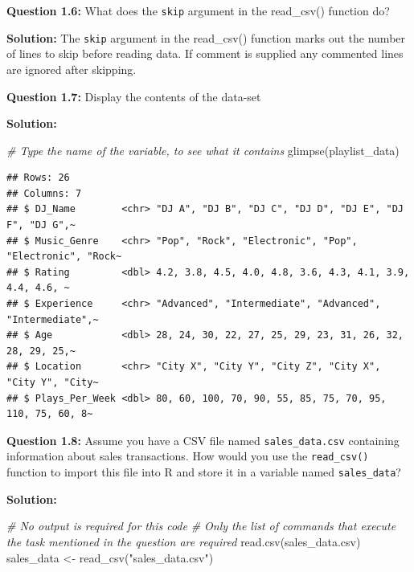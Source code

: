 \documentclass[
]{article}
\newenvironment{Shaded}{\begin{snugshade}}{\end{snugshade}}
\newcommand{\CommentTok}[1]{\textcolor[rgb]{0.56,0.35,0.01}{\textit{#1}}}
\newcommand{\FunctionTok}[1]{\textcolor[rgb]{0.00,0.00,0.00}{#1}}
\newcommand{\NormalTok}[1]{#1}
\newcommand{\OtherTok}[1]{\textcolor[rgb]{0.56,0.35,0.01}{#1}}
\newcommand{\StringTok}[1]{\textcolor[rgb]{0.31,0.60,0.02}{#1}}
\begin{document}
\textbf{Question 1.6:} What does the \texttt{skip} argument in the
read\_csv() function do?

\textbf{Solution:} The \texttt{skip} argument in the read\_csv()
function marks out the number of lines to skip before reading data. If
comment is supplied any commented lines are ignored after skipping.

\textbf{Question 1.7:} Display the contents of the data-set

\textbf{Solution:}

\begin{Shaded}
\begin{Highlighting}[]
\CommentTok{\# Type the name of the variable, to see what it contains}
\FunctionTok{glimpse}\NormalTok{(playlist\_data)}
\end{Highlighting}
\end{Shaded}

\begin{verbatim}
## Rows: 26
## Columns: 7
## $ DJ_Name        <chr> "DJ A", "DJ B", "DJ C", "DJ D", "DJ E", "DJ F", "DJ G",~
## $ Music_Genre    <chr> "Pop", "Rock", "Electronic", "Pop", "Electronic", "Rock~
## $ Rating         <dbl> 4.2, 3.8, 4.5, 4.0, 4.8, 3.6, 4.3, 4.1, 3.9, 4.4, 4.6, ~
## $ Experience     <chr> "Advanced", "Intermediate", "Advanced", "Intermediate",~
## $ Age            <dbl> 28, 24, 30, 22, 27, 25, 29, 23, 31, 26, 32, 28, 29, 25,~
## $ Location       <chr> "City X", "City Y", "City Z", "City X", "City Y", "City~
## $ Plays_Per_Week <dbl> 80, 60, 100, 70, 90, 55, 85, 75, 70, 95, 110, 75, 60, 8~
\end{verbatim}

\textbf{Question 1.8:} Assume you have a CSV file named
\texttt{sales\_data.csv} containing information about sales
transactions. How would you use the \texttt{read\_csv()} function to
import this file into R and store it in a variable named
\texttt{sales\_data}?

\textbf{Solution:}

\begin{Shaded}
\begin{Highlighting}[]
\CommentTok{\# No output is required for this code}
\CommentTok{\# Only the list of commands that execute the task mentioned in the question are required}
\FunctionTok{read.csv}\NormalTok{(sales\_data.csv)}
\NormalTok{sales\_data }\OtherTok{\textless{}{-}} \FunctionTok{read\_csv}\NormalTok{(}\StringTok{"sales\_data.csv"}\NormalTok{) }
\end{Highlighting}
\end{Shaded}
\end{document}
